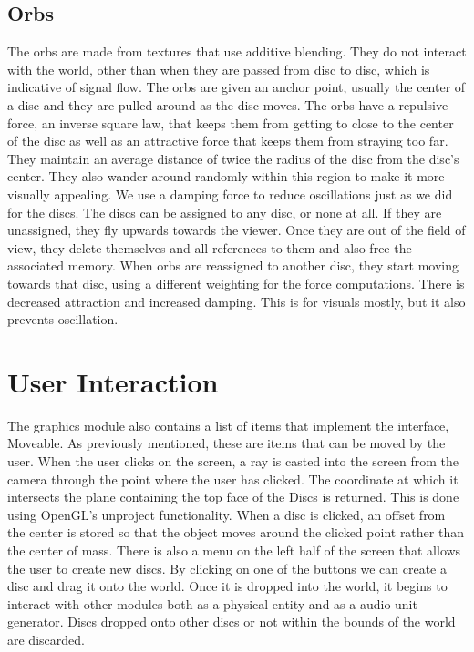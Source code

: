 \documentclass[pdftext,twoside,10pt]{article}
\begin{document}
\subsection{Orbs}
The orbs are made from textures that use additive blending. They do not interact with the world, other than when they are passed from disc to disc, which is indicative of signal flow. The orbs are given an anchor point, usually the center of a disc and they are pulled around as the disc moves. The orbs have a repulsive force, an inverse square law, that keeps them from getting to close to the center of the disc as well as an attractive force that keeps them from straying too far. They maintain an average distance of twice the radius of the disc from the disc's center. They also wander around randomly within this region to make it more visually appealing. We use a damping force to reduce oscillations just as we did for the discs. The discs can be assigned to any disc, or none at all. If they are unassigned, they fly upwards towards the viewer. Once they are out of the field of view, they delete themselves and all references to them and also free the associated memory. When orbs are reassigned to another disc, they start moving towards that disc, using a different weighting for the force computations. There is decreased attraction and increased damping. This is for visuals mostly, but it also prevents oscillation.

\section{User Interaction}
The graphics module also contains a list of items that implement the interface, Moveable. As previously mentioned, these are items that can be moved by the user. When the user clicks on the screen, a ray is casted into the screen from the camera through the point where the user has clicked. The coordinate at which it intersects the plane containing the top face of the Discs is returned. This is done using OpenGL's unproject functionality. When a disc is clicked, an offset from the center is stored so that the object moves around the clicked point rather than the center of mass. There is also a menu on the left half of the screen that allows the user to create new discs. By clicking on one of the buttons we can create a disc and drag it onto the world. Once it is dropped into the world, it begins to interact with other modules both as a physical entity and as a audio unit generator. Discs dropped onto other discs or not within the bounds of the world are discarded.
\end{document}
